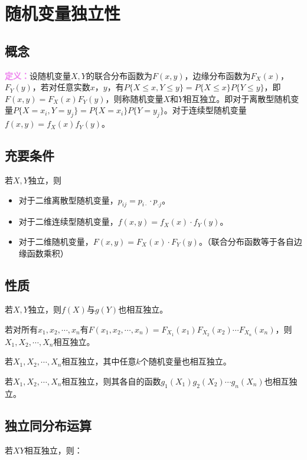 \section{随机变量独立性}

\subsection{概念}

\textcolor{violet}{\textbf{定义：}}设随机变量$X,Y$的联合分布函数为$F(x,y)$，边缘分布函数为$F_X(x)$，$F_Y(y)$，若对任意实数$x$，$y$，有$P\{X\leqslant x,Y\leqslant y\}=P\{X\leqslant x\}P\{Y\leqslant y\}$，即$F(x,y)=F_X(x)F_Y(y)$，则称随机变量$X$和$Y$相互独立。即对于离散型随机变量$P\{X=x_i,Y=y_j\}=P\{X=x_i\}P\{Y=y_j\}$。对于连续型随机变量$f(x,y)=f_X(x)f_Y(y)$。

\subsection{充要条件}

若$X,Y$独立，则

\begin{itemize}
    \item 对于二维离散型随机变量，$p_{ij}=p_{i\cdot}\cdot p_{\cdot j}$。
    \item 对于二维连续型随机变量，$f(x,y)=f_X(x)\cdot f_Y(y)$。
    \item 对于二维随机变量，$F(x,y)=F_X(x)\cdot F_Y(y)$。（联合分布函数等于各自边缘函数乘积）
\end{itemize}

\subsection{性质}

若$X,Y$独立，则$f(X)$与$g(Y)$也相互独立。

若对所有$x_1,x_2,\cdots,x_n$有$F(x_1,x_2,\cdots,x_n)=F_{X_1}(x_1)F_{X_2}(x_2)\cdots F_{X_n}(x_n)$，则$X_1,X_2,\cdots,X_n$相互独立。

若$X_1,X_2,\cdots,X_n$相互独立，其中任意$k$个随机变量也相互独立。

若$X_1,X_2,\cdots,X_n$相互独立，则其各自的函数$g_1(X_1)g_2(X_2)\cdots g_n(X_n)$也相互独立。

\subsection{独立同分布运算}

若$XY$相互独立，则：

